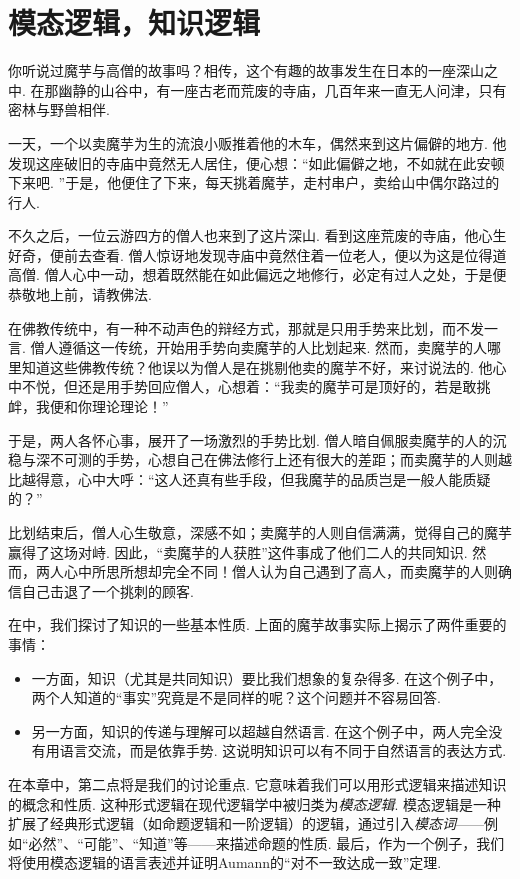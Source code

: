 \chapter{模态逻辑，知识逻辑}\label{chap:modal-logic}

你听说过魔芋与高僧的故事吗？相传，这个有趣的故事发生在日本的一座深山之中. 在那幽静的山谷中，有一座古老而荒废的寺庙，几百年来一直无人问津，只有密林与野兽相伴. 

一天，一个以卖魔芋为生的流浪小贩推着他的木车，偶然来到这片偏僻的地方. 他发现这座破旧的寺庙中竟然无人居住，便心想：“如此偏僻之地，不如就在此安顿下来吧. ”于是，他便住了下来，每天挑着魔芋，走村串户，卖给山中偶尔路过的行人. 

不久之后，一位云游四方的僧人也来到了这片深山. 看到这座荒废的寺庙，他心生好奇，便前去查看. 僧人惊讶地发现寺庙中竟然住着一位老人，便以为这是位得道高僧. 僧人心中一动，想着既然能在如此偏远之地修行，必定有过人之处，于是便恭敬地上前，请教佛法. 

在佛教传统中，有一种不动声色的辩经方式，那就是只用手势来比划，而不发一言. 僧人遵循这一传统，开始用手势向卖魔芋的人比划起来. 然而，卖魔芋的人哪里知道这些佛教传统？他误以为僧人是在挑剔他卖的魔芋不好，来讨说法的. 他心中不悦，但还是用手势回应僧人，心想着：“我卖的魔芋可是顶好的，若是敢挑衅，我便和你理论理论！”

于是，两人各怀心事，展开了一场激烈的手势比划. 僧人暗自佩服卖魔芋的人的沉稳与深不可测的手势，心想自己在佛法修行上还有很大的差距；而卖魔芋的人则越比越得意，心中大呼：“这人还真有些手段，但我魔芋的品质岂是一般人能质疑的？”

比划结束后，僧人心生敬意，深感不如；卖魔芋的人则自信满满，觉得自己的魔芋赢得了这场对峙. 因此，“卖魔芋的人获胜”这件事成了他们二人的共同知识. 然而，两人心中所思所想却完全不同！僧人认为自己遇到了高人，而卖魔芋的人则确信自己击退了一个挑刺的顾客. 

在中，我们探讨了知识的一些基本性质. 上面的魔芋故事实际上揭示了两件重要的事情：
\begin{itemize}
    \item 一方面，知识（尤其是共同知识）要比我们想象的复杂得多. 在这个例子中，两个人知道的“事实”究竟是不是同样的呢？这个问题并不容易回答. 
    \item 另一方面，知识的传递与理解可以超越自然语言. 在这个例子中，两人完全没有用语言交流，而是依靠手势. 这说明知识可以有不同于自然语言的表达方式. 
\end{itemize}

在本章中，第二点将是我们的讨论重点. 它意味着我们可以用形式逻辑来描述知识的概念和性质. 这种形式逻辑在现代逻辑学中被归类为\textit{模态逻辑}. 模态逻辑是一种扩展了经典形式逻辑（如命题逻辑和一阶逻辑）的逻辑，通过引入\textit{模态词}——例如“必然”、“可能”、“知道”等——来描述命题的性质. 最后，作为一个例子，我们将使用模态逻辑的语言表述并证明Aumann的“对不一致达成一致”定理. 

